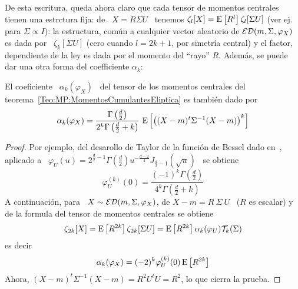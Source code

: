 De  esta escritura,  queda ahora  claro que  cada tensor  de  momentos centrales
tienen  una estrctura  fija: de  \ $X  =  R \Sigma  U$ \  tenemos $\zeta_l[X]  =
\operatorname{E}\left[  R^l \right]  \zeta_l[\Sigma  U]$ (ver  ej.~\cite[teo.~2.8]{FanKot90}
para $\Sigma \propto I$): la estructura, com\'un a cualquier vector aleatorio de
$\mathcal{ED}(m,\Sigma,\varphi_X)$ es dada por \  $\zeta_k[\Sigma U]$ (cero cuando $l = 2
k + 1$, por  simetr\'ia central) y el factor, dependiente de  la ley es dada por
el  momento  del  ``rayo'' $R$.  Adem\'as,  se  puede  dar  una otra  forma  del
coefficiente $\alpha_k$:
%
\begin{lema}
  El coeficiente \ $\alpha_k(\varphi_X)$ \  del tensor de los momentos centrales
  del teorema~\ref{Teo:MP:MomentosCumulantesEliptica} es tambi\'en dado por
  \[
  \alpha_k(\varphi_X) = \frac{\Gamma\left( \frac{d}{2} \right)}{2^k \Gamma\left(
      \frac{d}{2}  + k\right)}  \, \operatorname{E}\left[  \left( (X-m)^t  \Sigma^{-1} (X-m)
    \right)^k \right]
  \]
\end{lema}
%
\begin{proof}
  Por  ejemplo,  del  desarollo  de  Taylor  de  la  funci\'on  de  Bessel  dado
  en~\cite{GraRyz15},   aplicado   a   \   $\varphi_U(u)   =   2^{\frac{d}{2}-1}
  \Gamma\left(  \frac{d}{2} \right) u^{-\frac{d-2}{4}}  J_{\frac{d}{2}-1} \left(
    \sqrt{u} \right)$ \ se obtiene
  \[
  \varphi_U^{(k)}(0)   =  \frac{(-1)^k   \Gamma\left(   \frac{d}{2}  \right)}{4^k
  \Gamma\left( \frac{d}{2} + k\right)}
  \]
  A  continuaci\'on, para  \ $X  \sim \mathcal{ED}(m,\Sigma,\varphi_X)$,  de $X-m  =  R \
  \Sigma  \ U$  \  ($R$ es  escalar)  y de  la formula  del  tensor de  momentos
  centrales se obtiene
  \[
  \zeta_{2    k}[X]     =    \operatorname{E}\left[    R^{2     k}    \right]
  \zeta_{2   k}[\Sigma   U]   =   \operatorname{E}\left[  R^{2   k}   \right]
  \alpha_k(\varphi_U) \mathcal{T}_k(\Sigma)
  \]
  es decir
  \[
  \alpha_k(\varphi_X) = (-2)^k \varphi_U^{(k)}(0) \operatorname{E}\left[ R^{2 k} \right]
  \]
  Ahora, $(X-m)^t \Sigma^{-1} (X-m) = R^2 U^t U = R^2$, lo que cierra la prueba.
\end{proof}

